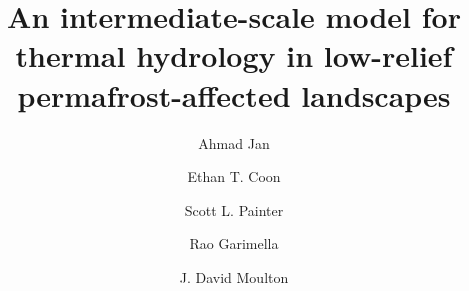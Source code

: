 \documentclass[review]{elsarticle}
\begin{document}
\begin{frontmatter}

\title{An intermediate-scale model for thermal hydrology in low-relief permafrost-affected landscapes}

\author[ornl]{Ahmad Jan} \author[lanl1]{Ethan T. Coon} \author[ornl]{Scott L. Painter} \author[lanl2]{Rao Garimella} \author[lanl2]{J. David Moulton}

\address[ornl]{Climate Change Science Institute and Environmental Sciences Division, Oak Ridge National Laboratory, Oak Ridge, Tennessee, USA} 
\address[lanl1]{Computational Earth Sciences Group, Earth and Environmental Sciences Division, Los Alamos National Laboratory, Los Alamos, New Mexico, USA} 
\address[lanl2]{Applied Mathematics and Plasma Physics Group, Theoretical Division, Los Alamos National Laboratory, Los Alamos, New Mexico, USA} 







\end{frontmatter}
\end{document}

